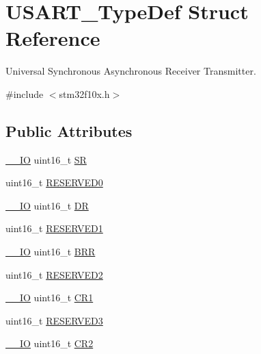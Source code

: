 \hypertarget{struct_u_s_a_r_t___type_def}{\section{U\-S\-A\-R\-T\-\_\-\-Type\-Def Struct Reference}
\label{struct_u_s_a_r_t___type_def}
}


Universal Synchronous Asynchronous Receiver Transmitter.  




{\ttfamily \#include $<$stm32f10x.\-h$>$}

\subsection*{Public Attributes}
\begin{DoxyCompactItemize}
\item 
\hyperlink{group___c_m_s_i_s__core__definitions_gaec43007d9998a0a0e01faede4133d6be}{\-\_\-\-\_\-\-I\-O} uint16\-\_\-t \hyperlink{struct_u_s_a_r_t___type_def_a3f1fd9f0c004d3087caeba4815faa41c}{S\-R}
\item 
uint16\-\_\-t \hyperlink{struct_u_s_a_r_t___type_def_a84ccd64c74c8dbc78b94172ce759de10}{R\-E\-S\-E\-R\-V\-E\-D0}
\item 
\hyperlink{group___c_m_s_i_s__core__definitions_gaec43007d9998a0a0e01faede4133d6be}{\-\_\-\-\_\-\-I\-O} uint16\-\_\-t \hyperlink{struct_u_s_a_r_t___type_def_accee34aaec89aad4aeef512bba173ae5}{D\-R}
\item 
uint16\-\_\-t \hyperlink{struct_u_s_a_r_t___type_def_a6d78680272a465db0ee43eba4e9c54f3}{R\-E\-S\-E\-R\-V\-E\-D1}
\item 
\hyperlink{group___c_m_s_i_s__core__definitions_gaec43007d9998a0a0e01faede4133d6be}{\-\_\-\-\_\-\-I\-O} uint16\-\_\-t \hyperlink{struct_u_s_a_r_t___type_def_a2044eb2a0a8a731400d309741bceb2f7}{B\-R\-R}
\item 
uint16\-\_\-t \hyperlink{struct_u_s_a_r_t___type_def_af2b7924854e56d0ebd3e8699dfd0e369}{R\-E\-S\-E\-R\-V\-E\-D2}
\item 
\hyperlink{group___c_m_s_i_s__core__definitions_gaec43007d9998a0a0e01faede4133d6be}{\-\_\-\-\_\-\-I\-O} uint16\-\_\-t \hyperlink{struct_u_s_a_r_t___type_def_a5de50313b1437f7f926093f00902d37a}{C\-R1}
\item 
uint16\-\_\-t \hyperlink{struct_u_s_a_r_t___type_def_a158066c974911c14efd7ea492ea31137}{R\-E\-S\-E\-R\-V\-E\-D3}
\item 
\hyperlink{group___c_m_s_i_s__core__definitions_gaec43007d9998a0a0e01faede4133d6be}{\-\_\-\-\_\-\-I\-O} uint16\-\_\-t \hyperlink{struct_u_s_a_r_t___type_def_a2a494156d185762e4596696796c393bc}{C\-R2}

\end{DoxyCompactItemize}
